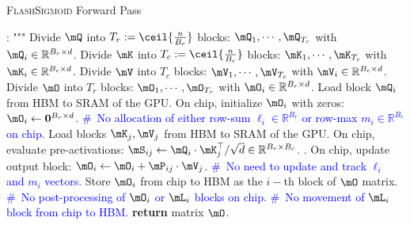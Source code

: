 \begin{algorithm}[!h]
    \caption{\textsc{FlashSigmoid} Forward Pass}
    \label{alg:FlashSigmoidForward}
    \begin{algorithmic}[1]
    :
        \State {\textcolor{gray}{"""}}
        \State
        \State {}
        \State """
        \State Divide $\mQ$ into $T_r := \ceil{\frac{n}{B_r}}$ blocks: $\mQ_1, \cdots, \mQ_{T_r}$ with $\mQ_i\in\mathbb{R}^{B_r\times d}$. 
        \State Divide $\mK$ into $T_c := \ceil{\frac{n}{B_c}}$ blocks: $\mK_1, \cdots, \mK_{T_c}$ with $\mK_i\in\mathbb{R}^{B_c\times d}$. 
        \State Divide $\mV$ into $T_c$ blocks: $\mV_1, \cdots, \mV_{T_c}$ with $\mV_i\in\mathbb{R}^{B_c\times d}$. 
        \State Divide $\mO$ into $T_r$ blocks: $\mO_1, \cdots, \mO_{T_r}$ with $\mO_i\in\mathbb{R}^{B_r\times d}$. 
            \State Load block $\mQ_i$ from HBM to SRAM of the GPU.
            \State On chip, initialize $\mO_i$ with zeros: $\mO_i \leftarrow \mathbf{0}^{B_r\times d}$.
            \State\qquad{} {\textcolor{blue}{\#\ No allocation of either row-sum $\ell_i\in\mathbb{R}^{B_r}$ or row-max $m_i\in\mathbb{R}^{B_r}$ on chip.}}
                \State Load blocks $\mK_j, \mV_j$ from HBM to SRAM of the GPU.
                \State On chip, evaluate pre-activations: $\mS_{ij} \leftarrow \mQ_i\cdot \mK_j^\top / \sqrt{d}\in \mathbb{R}^{B_r\times B_c}$.
                .
                \State On chip, update output block: $\mO_i \leftarrow \mO_i + \mP_{ij}\cdot \mV_j$.
                \State \qquad{} {\textcolor{blue}{\#\ No need to update and track $\ell_i$ and $m_i$ vectors.}}
            \EndFor
            \State Store $\mO_i$ from chip to HBM as the $i-$th block of $\mO$ matrix. 
            \State \qquad{} {\textcolor{blue}{\#\ No post-processing of $\mO_i$ or $\mL_i$ blocks on chip.}}
            \State \qquad{} {\textcolor{blue}{\#\ No movement of $\mL_i$ block from chip to HBM.}}
        \EndFor
        \State \textbf{return} matrix $\mO$. 
    \EndProcedure
    \end{algorithmic}
\end{algorithm}
